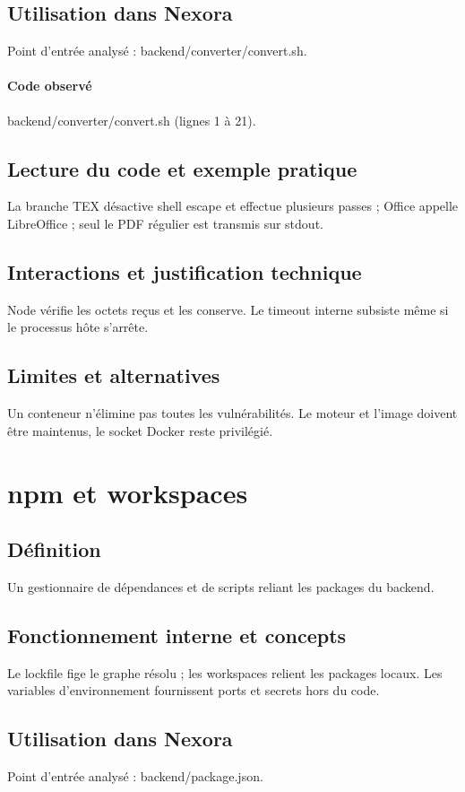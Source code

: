 \subsection*{Utilisation dans Nexora}
Point d’entrée analysé : backend/converter/convert.sh.

\paragraph{Code observé} backend/converter/convert.sh (lignes 1 à 21).

\subsection*{Lecture du code et exemple pratique}
La branche TEX désactive shell escape et effectue plusieurs passes ; Office appelle LibreOffice ; seul le PDF régulier est transmis sur stdout.

\subsection*{Interactions et justification technique}
Node vérifie les octets reçus et les conserve. Le timeout interne subsiste même si le processus hôte s’arrête.

\subsection*{Limites et alternatives}
Un conteneur n’élimine pas toutes les vulnérabilités. Le moteur et l’image doivent être maintenus, le socket Docker reste privilégié.

\section{npm et workspaces}
\subsection*{Définition}
Un gestionnaire de dépendances et de scripts reliant les packages du backend.

\subsection*{Fonctionnement interne et concepts}
Le lockfile fige le graphe résolu ; les workspaces relient les packages locaux. Les variables d’environnement fournissent ports et secrets hors du code.

\subsection*{Utilisation dans Nexora}
Point d’entrée analysé : backend/package.json.

